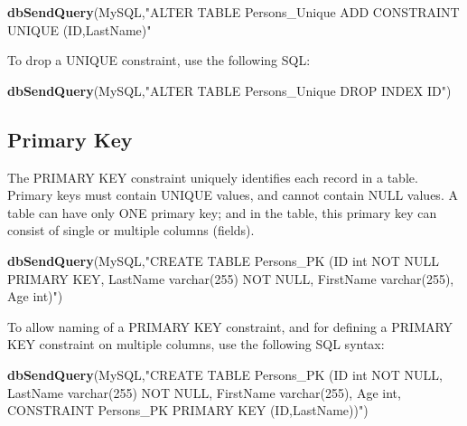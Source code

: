 \documentclass[
]{book}
\newenvironment{Shaded}{\begin{snugshade}}{\end{snugshade}}
\newcommand{\FunctionTok}[1]{\textcolor[rgb]{0.13,0.29,0.53}{\textbf{#1}}}
\newcommand{\NormalTok}[1]{#1}
\newcommand{\StringTok}[1]{\textcolor[rgb]{0.31,0.60,0.02}{#1}}
\begin{document}
\begin{Shaded}
\begin{Highlighting}[]
\FunctionTok{dbSendQuery}\NormalTok{(MySQL,}\StringTok{"ALTER TABLE Persons\_Unique}
\StringTok{                  ADD CONSTRAINT UNIQUE (ID,LastName)"}
\end{Highlighting}
\end{Shaded}

To drop a UNIQUE constraint, use the following SQL:

\begin{Shaded}
\begin{Highlighting}[]
\FunctionTok{dbSendQuery}\NormalTok{(MySQL,}\StringTok{"ALTER TABLE Persons\_Unique}
\StringTok{                  DROP INDEX ID"}\NormalTok{)}
\end{Highlighting}
\end{Shaded}

\hypertarget{primary-key}{%
\subsection{Primary Key}\label{primary-key}}

The PRIMARY KEY constraint uniquely identifies each record in a table. Primary keys must contain UNIQUE values, and cannot contain NULL values. A table can have only ONE primary key; and in the table, this primary key can consist of single or multiple columns (fields).

\begin{Shaded}
\begin{Highlighting}[]
\FunctionTok{dbSendQuery}\NormalTok{(MySQL,}\StringTok{"CREATE TABLE Persons\_PK (ID int NOT NULL PRIMARY KEY,}
\StringTok{                   LastName varchar(255) NOT NULL,}
\StringTok{                   FirstName varchar(255),}
\StringTok{                   Age int)"}\NormalTok{)}
\end{Highlighting}
\end{Shaded}

To allow naming of a PRIMARY KEY constraint, and for defining a PRIMARY KEY constraint on multiple columns, use the following SQL syntax:

\begin{Shaded}
\begin{Highlighting}[]
\FunctionTok{dbSendQuery}\NormalTok{(MySQL,}\StringTok{"CREATE TABLE Persons\_PK (ID int NOT NULL,}
\StringTok{                  LastName varchar(255) NOT NULL,}
\StringTok{                  FirstName varchar(255),}
\StringTok{                  Age int,}
\StringTok{                  CONSTRAINT Persons\_PK PRIMARY KEY (ID,LastName))"}\NormalTok{)}
\end{Highlighting}
\end{Shaded}
\end{document}
